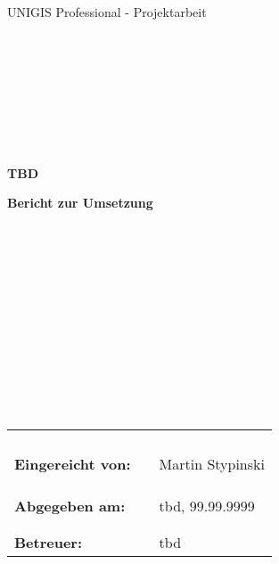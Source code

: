 \begin{center}

\begin{verbatim}

\end{verbatim}

\begin{center}
\Large{UNIGIS Professional - Projektarbeit}
\end{center}
\begin{verbatim}









\end{verbatim}
\begin{center}
\textbf{\LARGE{TBD}}
\end{center}
\begin{center}
\textbf{Bericht zur Umsetzung}
\end{center}
\begin{verbatim}


\end{verbatim}
\begin{verbatim}












\end{verbatim}

\begin{flushleft}
\begin{tabular}{lll}
& & \\
& & \\
& & \\
& & \\
\textbf{Eingereicht von:} & & Martin Stypinski \\
& & \\
& & \\
& & \\
\textbf{Abgegeben am:} & & tbd, 99.99.9999\\
& & \\
& & \\
\textbf{Betreuer:} & & tbd
\end{tabular}
\end{flushleft}
\end{center}
